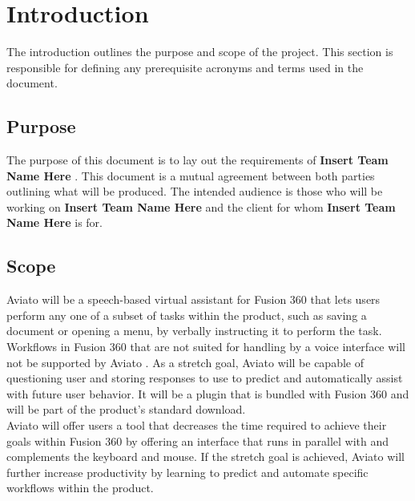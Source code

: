 \documentclass[onecolumn, draftclsnofoot,10pt, compsoc]{IEEEtran}
\def \CapstoneTeamName{\textbf{Insert Team Name Here} }
\def \botname{Aviato }
\begin{document}
\section{Introduction}
        The introduction outlines the purpose and scope of the project. 
        This section is responsible for defining any prerequisite acronyms and terms used in the document. 
    \subsection{Purpose}
        The purpose of this document is to lay out the requirements of \CapstoneTeamName. 
        This document is a mutual agreement between both parties outlining what will be produced. 
        The intended audience is those who will be working on \CapstoneTeamName and the client for whom \CapstoneTeamName is for.
    \subsection{Scope}
        \botname will be a speech-based virtual assistant for Fusion 360 that lets users perform any one of a subset of tasks within the product, such as saving a document or opening a menu, by verbally instructing it to perform the task.
        Workflows in Fusion 360 that are not suited for handling by a voice interface will not be supported by \botname.
        As a stretch goal, \botname will be capable of questioning user and storing responses to use to predict and automatically assist with future user behavior.
        It will be a plugin that is bundled with Fusion 360 and will be part of the product's standard download. \\

        \botname will offer users a tool that decreases the time required to achieve their goals within Fusion 360 by offering an interface that runs in parallel with and complements the keyboard and mouse.
        If the stretch goal is achieved, \botname will further increase productivity by learning to predict and automate specific workflows within the product.
        
\end{document}
